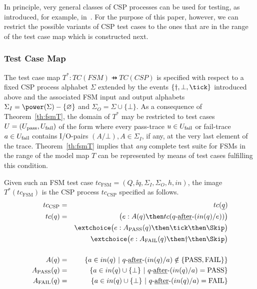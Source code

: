  In principle, very general classes of CSP processes can be
 used for testing, as introduced, for example,
 in~\cite{DBLP:conf/fm/PeleskaS96,peleska1997a}. For the purpose of this paper, however, we can restrict the possible variants of CSP test cases to the ones that are in the range of the test case map which is constructed next.


\subsubsection{Test Case Map}

The test case map $T^* :TC(FSM) \pfun TC(CSP)$ is specified with respect to a fixed
CSP process alphabet $\Sigma$ extended by the events $\{\dag,\bot,\tick \}$ introduced
above
and the associated FSM input and output alphabets
$\Sigma_I = \power(\Sigma)-\{\varnothing\}$ and $\Sigma_O=\Sigma\cup \{\bot \}$.
As a consequence of Theorem~\ref{th:fsmT}, the domain of $T^*$ may be restricted to
test cases $U = ({U}_\text{pass},{U}_\text{fail})$ of the form where every pass-trace $u\in{U}_\text{fail}$
or fail-trace $a\in{U}_\text{fail}$ contains I/O-pairs $(A/\bot), A\in \Sigma_I$, if any, at the very last element of the trace. Theorem~\ref{th:fsmT} implies that {\it any} complete
test suite for FSMs in the range of the model map $T$ can be represented by means of
test cases fulfilling this condition.





Given such an FSM test case $tc_\text{FSM}=(Q,\ii q,\Sigma_I,\Sigma_O,h,in)$,
the image $T^*(tc_\text{FSM})$ is the CSP process $tc_\text{CSP}$ specified
as follows.
\begin{eqnarray*}
tc_\text{CSP} & = & tc(\ii q)
\\
tc(q) & = & \big( e :  A(q) \then  tc(q\after (in(q)/e)) \big)
\\ & & \extchoice
 \big( e : A_\text{PASS}(q)   \then \tick \then \Skip \big)
\\ & & \extchoice
 \big( e : A_\text{FAIL}(q) \then \dag \then \Skip \big)
\\ & &
\\
A(q) & = & \{ a\in in(q)~|~q\after (in(q)/a)\notin \{\text{PASS},\text{FAIL}\} \}
\\
A_\text{PASS}(q) & = & \{ a\in in(q)\cup\{\bot\}~|~q\after(in(q)/a) = \text{PASS} \}
\\
A_\text{FAIL}(q) & = & \{ a\in in(q)\cup\{\bot\}~|~q\after(in(q)/a) = \text{FAIL} \}
\end{eqnarray*}


